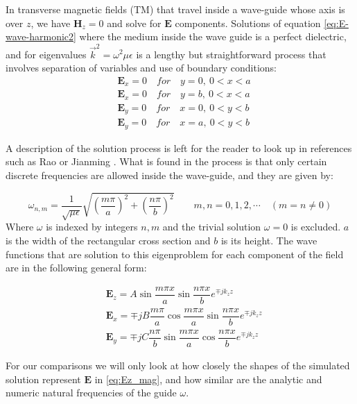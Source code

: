 In transverse magnetic fields (TM) that travel inside a wave-guide whose axis is over $z$, we have $\mathbf{H}_z = 0$ and solve for $\mathbf{E}$ components. 
Solutions of equation \ref{eq:E-wave-harmonic2} where the medium inside the wave guide is a perfect dielectric, and  for eigenvalues $\vec{k}^2 = \omega^2\mu\epsilon$ is a lengthy but straightforward process that involves separation of variables and use of boundary conditions:
\begin{align}
&\mathbf{E}_x = 0 \quad for \quad y=0,\ 0<x<a\\
&\mathbf{E}_x = 0 \quad for \quad y=b,\ 0<x<a\\
&\mathbf{E}_y = 0 \quad for \quad x=0,\ 0<y<b\\
&\mathbf{E}_y = 0 \quad for \quad x=a,\ 0<y<b
\label{eq:square_bc}
\end{align}

A description of the solution process is left for the reader to look up in references such as Rao  \cite{Rao2004} or Jianming \cite{Jin2010}. What is found in the process is that only certain discrete frequencies are allowed inside the wave-guide, and they are given by:

\begin{equation}
\omega_{n,m} = \frac{1}{\sqrt{\mu\epsilon}}\sqrt{\left(\frac{m\pi}{a}\right)^2+\left(\frac{n\pi}{b}\right)^2}
\qquad m,n = 0,1,2,\cdots \quad (m=n\neq0)
\label{eq:eig_vals_sqare_waveguide}
\end{equation}
Where $\omega$ is indexed by integers $n,m$ and the trivial solution $\omega = 0$ is excluded. $a$ is the width of the rectangular cross section and $b$ is its height.
The wave functions that are solution to this eigenproblem for each component of the field are in the following general form:

\begin{align}
&\mathbf{E}_z = A\sin{\dfrac{m\pi x}{a}}\sin{\dfrac{n\pi x}{b}}e^{\mp jk_zz} \label{eq:Ez_mag}\\
&\mathbf{E}_x =\mp jB\dfrac{m\pi}{a}\cos{\dfrac{m\pi x}{a}}\sin{\dfrac{n\pi x}{b}}e^{\mp jk_zz}\\
&\mathbf{E}_y =\mp jC\dfrac{n\pi}{b}\sin{\dfrac{m\pi x}{a}}\cos{\dfrac{n\pi x}{b}}e^{\mp jk_zz}
\end{align}

For our comparisons we will only look at how closely the shapes of the simulated solution represent $\mathbf{E}$ in \ref{eq:Ez_mag}, and how similar are the analytic and numeric  natural frequencies of the guide $\omega$.

